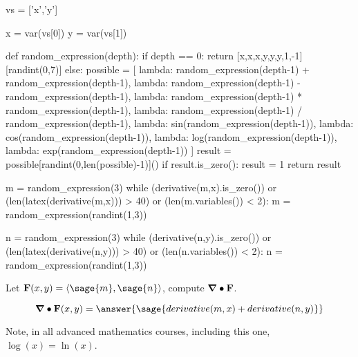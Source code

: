 \documentclass{ximera}
\author{Jim Fowler \and Bart Snapp}
\begin{document}
\makerandom
\begin{sagesilent}
  vs = ['x','y']
  
  x = var(vs[0])
  y = var(vs[1])

  def random_expression(depth):
    if depth == 0:
      return [x,x,x,y,y,y,1,-1][randint(0,7)]
    else:
      possible = [
        lambda: random_expression(depth-1) + random_expression(depth-1),
        lambda: random_expression(depth-1) - random_expression(depth-1),
        lambda: random_expression(depth-1) * random_expression(depth-1),
        lambda: random_expression(depth-1) / random_expression(depth-1),
        lambda: sin(random_expression(depth-1)),
        lambda: cos(random_expression(depth-1)),
        lambda: log(random_expression(depth-1)),
        lambda: exp(random_expression(depth-1))
      ]
      result = possible[randint(0,len(possible)-1)]()
      if result.is_zero():
        result = 1
      return result

  m = random_expression(3)
  while (derivative(m,x).is_zero()) or (len(latex(derivative(m,x))) > 40) or (len(m.variables()) < 2):
    m = random_expression(randint(1,3))

  n = random_expression(3)
  while (derivative(n,y).is_zero()) or (len(latex(derivative(n,y))) > 40) or (len(n.variables()) < 2):
    n = random_expression(randint(1,3))
  
\end{sagesilent}

\begin{exercise}

  Let $\vec{F}(x,y) = \vector{\sage{m},\sage{n}}$, compute $\boldsymbol\nabla\bullet \mathbf{F}$.
  \begin{prompt}
  \[
  \divergence \vec{F}(x,y) = \answer{\sage{derivative(m,x) + derivative(n,y)}}
  \]
  \end{prompt}
  \begin{hint}
    Note, in all advanced mathematics courses, including this one, $\log(x) = \ln(x)$.
  \end{hint}
\end{exercise}
\end{document}
